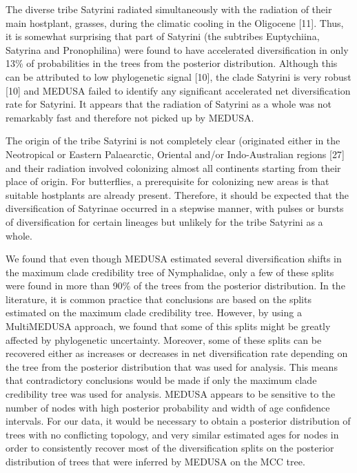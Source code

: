 \documentclass[]{article}
\begin{document}
The diverse tribe Satyrini radiated simultaneously with the radiation of
their main hostplant, grasses, during the climatic cooling in the
Oligocene {[}11{]}. Thus, it is somewhat surprising that part of
Satyrini (the subtribes Euptychiina, Satyrina and Pronophilina) were
found to have accelerated diversification in only 13\% of probabilities
in the trees from the posterior distribution. Although this can be
attributed to low phylogenetic signal {[}10{]}, the clade Satyrini is
very robust {[}10{]} and MEDUSA failed to identify any significant
accelerated net diversification rate for Satyrini. It appears that the
radiation of Satyrini as a whole was not remarkably fast and therefore
not picked up by MEDUSA.

The origin of the tribe Satyrini is not completely clear (originated
either in the Neotropical or Eastern Palaearctic, Oriental and/or
Indo-Australian regions {[}27{]} and their radiation involved colonizing
almost all continents starting from their place of origin. For
butterflies, a prerequisite for colonizing new areas is that suitable
hostplants are already present. Therefore, it should be expected that
the diversification of Satyrinae occurred in a stepwise manner, with
pulses or bursts of diversification for certain lineages but unlikely
for the tribe Satyrini as a whole.

We found that even though MEDUSA estimated several diversification
shifts in the maximum clade credibility tree of Nymphalidae, only a few
of these splits were found in more than 90\% of the trees from the
posterior distribution. In the literature, it is common practice that
conclusions are based on the splits estimated on the maximum clade
credibility tree. However, by using a MultiMEDUSA approach, we found
that some of this splits might be greatly affected by phylogenetic
uncertainty. Moreover, some of these splits can be recovered either as
increases or decreases in net diversification rate depending on the tree
from the posterior distribution that was used for analysis. This means
that contradictory conclusions would be made if only the maximum clade
credibility tree was used for analysis. MEDUSA appears to be sensitive
to the number of nodes with high posterior probability and width of age
confidence intervals. For our data, it would be necessary to obtain a
posterior distribution of trees with no conflicting topology, and very
similar estimated ages for nodes in order to consistently recover most
of the diversification splits on the posterior distribution of trees
that were inferred by MEDUSA on the MCC tree.
\end{document}
